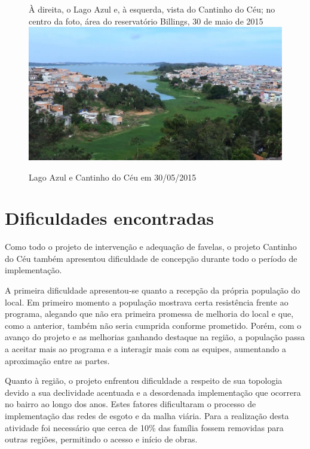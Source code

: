 	\begin{figure}[htb]
		\centering
		\caption{Lago Azul e Cantinho do Céu em 30/05/2015}{À direita, o Lago Azul e, à esquerda, vista do Cantinho do Céu; no centro da foto, área do reservatório Billings, 30 de maio de 2015}
		\includegraphics[width=\linewidth]{img/silva_p080_lago_cantinho}
		\label{fig:fotos_antes_01}
	\end{figure}
	
	
	\section{Dificuldades encontradas}
	
	Como todo o projeto de intervenção e adequação de favelas, o projeto Cantinho do Céu também apresentou dificuldade de concepção durante todo o período de implementação. 
	
	A primeira dificuldade apresentou-se quanto a recepção da própria população do local. Em primeiro momento a população mostrava certa resistência frente ao programa, alegando que não era primeira promessa de melhoria do local e que, como a anterior, também não seria cumprida conforme prometido. Porém, com o avanço do projeto e as melhorias ganhando destaque na região, a população passa a aceitar mais ao programa e a interagir mais com as equipes, aumentando a aproximação entre as partes.
	
	Quanto à região, o projeto enfrentou dificuldade a respeito de sua topologia devido a sua declividade acentuada e a desordenada implementação que ocorrera no bairro ao longo dos anos. Estes fatores dificultaram o processo de implementação das redes de esgoto e da malha viária. Para a realização desta atividade foi necessário que cerca de 10\% das família fossem removidas para outras regiões, permitindo o acesso e início de obras. 
	
